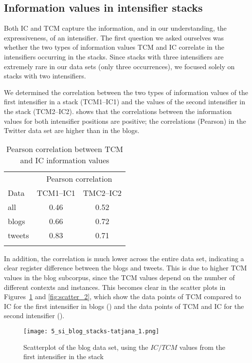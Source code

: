 \documentclass[output=paper,colorlinks,citecolor=brown]{langscibook}
\begin{document}
\subsection{Information values in intensifier stacks}

Both IC and TCM capture the information, and in our understanding, the expressiveness, of an intensifier. The first question we asked ourselves was whether the two types of information values TCM and IC correlate in the intensifiers occurring in the stacks. Since stacks with three intensifiers are extremely rare in our data sets (only three occurrences), we focused solely on stacks with two intensifiers. 

We determined the correlation between the two types of information values of the first intensifier in a stack (TCM1--IC1) and the values of the second intensifier in the stack (TCM2--IC2).
 shows that the correlations between the information values for both intensifier positions are positive; the correlations (Pearson) in the Twitter data set are higher than in the blogs.

\begin{table}
\begin{tabular}{lcc}
\lsptoprule
        & \multicolumn{2}{c}{Pearson correlation}\\\cmidrule(lr){2-3}
Data    & TCM1--IC1 & TMC2--IC2\\\midrule
all     & 0.46      &  0.52 \\
blogs   & 0.66      &  0.72 \\
tweets  & 0.83      &  0.71 \\
\lspbottomrule
\end{tabular} 
\caption{Pearson correlation between TCM and IC information values}\label{tab:corr}
\end{table}


In addition, the correlation is much lower across the entire data set, indicating a clear register difference between the blogs and tweets. 
This is due to higher TCM values in the blog subcorpus, since the  TCM values depend on the number of different contexts and instances. This becomes clear in the scatter plots in Figures~\ref{fig:scatter_1} and \ref{fig:scatter_2}, which show the data points of TCM compared to IC for the first intensifier in blogs () and  the data points of TCM and IC for the second intensifier ().

\begin{figure}
  \centering
%   
  \texttt{[image: 5\_si\_blog\_stacks-tatjana\_1.png]}
  \caption{Scatterplot of the blog data set, using the $IC/TCM$ values from the first intensifier in the stack}
  \label{fig:scatter_1}
\end{figure}
\end{document}
